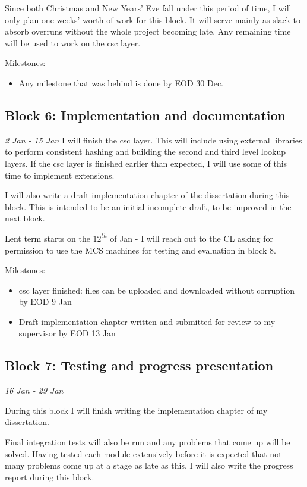 \documentclass[12pt]{article}
\begin{document}
Since both Christmas and New Years' Eve fall under this period of time, I will only plan one weeks' worth of work for this block. It will serve mainly as slack to absorb overruns without the whole project becoming late. Any remaining time will be used to work on the \gls{csc} layer.


Milestones:
\begin{itemize}
\item{Any milestone that was behind is done by EOD 30 Dec.}
\end{itemize}

\subsection{Block 6: Implementation and documentation}
\emph{2 Jan - 15 Jan}  %
I will finish the \gls{csc} layer. This will include using external libraries to perform consistent hashing and building the second and third level lookup layers. If the \gls{csc} layer is finished earlier than expected, I will use some of this time to implement extensions.

I will also write a draft implementation chapter of the dissertation during this block. This is intended to be an initial incomplete draft, to be improved in the next block. 

Lent term starts on the $12^{th}$ of Jan - I will reach out to the CL asking for permission to use the MCS machines for testing and evaluation in block 8.

Milestones:
\begin{itemize}
\item{\gls{csc} layer finished: files can be uploaded and downloaded without corruption by EOD 9 Jan}
\item{Draft implementation chapter written and submitted for review to my supervisor by EOD 13 Jan}
\end{itemize}

\subsection{Block 7: Testing and progress presentation}
\emph{16 Jan - 29 Jan} %

During this block I will finish writing the implementation chapter of my dissertation.

Final integration tests will also be run and any problems that come up will be solved. Having tested each module extensively before it is expected that not many problems come up at a stage as late as this. I will also write the progress report during this block.
\end{document}
